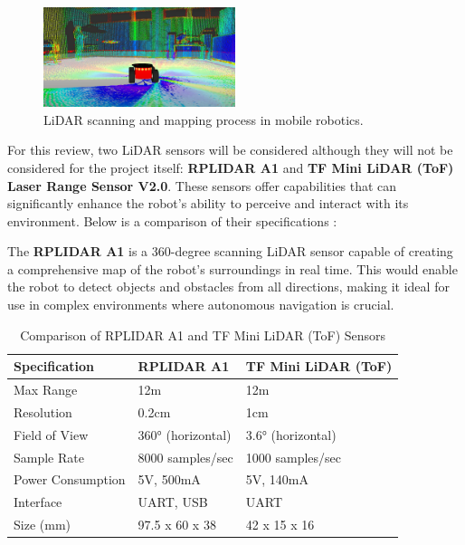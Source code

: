 \begin{figure}[hb]
    \centering
    \includegraphics[width=0.5\textwidth]{ch2/figs/lidar_graphic.png}
    \caption{LiDAR scanning and mapping process in mobile robotics.}
    \label{fig:lidar_graphic}
\end{figure}

For this review, two LiDAR sensors will be considered although they will not be considered for the project itself: \textbf{RPLIDAR A1} and \textbf{TF Mini LiDAR (ToF) Laser Range Sensor V2.0}. These sensors offer capabilities that can significantly enhance the robot's ability to perceive and interact with its environment. Below is a comparison of their specifications \cite{yang2022lidar}:

The \textbf{RPLIDAR A1} is a 360-degree scanning LiDAR sensor capable of creating a comprehensive map of the robot's surroundings in real time. This would enable the robot to detect objects and obstacles from all directions, making it ideal for use in complex environments where autonomous navigation is crucial.

\begin{table}[htpb]
\centering
\caption{Comparison of RPLIDAR A1 and TF Mini LiDAR (ToF) Sensors}
\label{tab:lidar_comparison}
\begin{tabular}{|l|l|l|} 
\hline
\textbf{Specification} & \textbf{RPLIDAR A1} & \textbf{TF Mini LiDAR (ToF)}  \\ 
\hline
Max Range              & 12m                 & 12m                           \\ 
\hline
Resolution             & 0.2cm               & 1cm                           \\ 
\hline
Field of View          & 360° (horizontal)   & 3.6° (horizontal)             \\ 
\hline
Sample Rate            & 8000 samples/sec    & 1000 samples/sec              \\ 
\hline
Power Consumption      & 5V, 500mA           & 5V, 140mA                     \\ 
\hline
Interface              & UART, USB           & UART                          \\ 
\hline
Size (mm)              & 97.5 x 60 x 38      & 42 x 15 x 16                  \\
\hline
\end{tabular}
\end{table}

